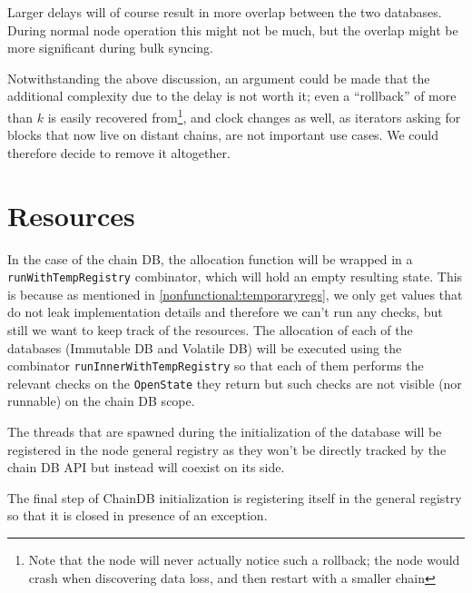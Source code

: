 Larger delays will of course result in more overlap between the two databases.
During normal node operation this might not be much, but the overlap might be
more significant during bulk syncing.

Notwithstanding the above discussion, an argument could be made that the
additional complexity due to the delay is not worth it; even a ``rollback'' of
more than $k$ is easily recovered from\footnote{Note that the node will never
actually notice such a rollback; the node would crash when discovering data
loss, and then restart with a smaller chain}, and clock changes as well, as
iterators asking for blocks that now live on distant chains, are not important
use cases. We could therefore decide to remove it altogether.

\section{Resources}
\label{chaindb:resources}

In the case of the chain DB, the allocation function will be wrapped in a
\lstinline!runWithTempRegistry! combinator, which will hold an empty resulting
state. This is because as mentioned in \ref{nonfunctional:temporaryregs}, we only get
values that do not leak implementation details and therefore we can't run any
checks, but still we want to keep track of the resources. The allocation of each
of the databases (Immutable DB and Volatile DB) will be executed using the
combinator \lstinline!runInnerWithTempRegistry! so that each of them performs
the relevant checks on the \lstinline!OpenState! they return but such checks are
not visible (nor runnable) on the chain DB scope.

The threads that are spawned during the initialization of the database will be
registered in the node general registry as they won't be directly tracked by the
chain DB API but instead will coexist on its side.

The final step of ChainDB initialization is registering itself in the general
registry so that it is closed in presence of an exception.
